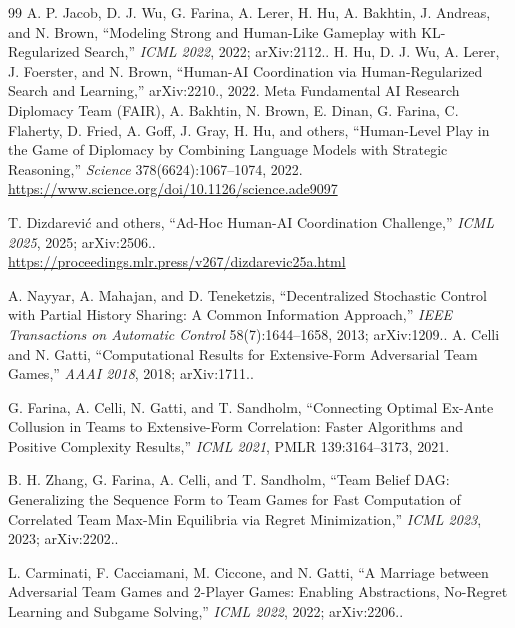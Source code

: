 \begin{thebibliography}{99}
A. P. Jacob, D. J. Wu, G. Farina, A. Lerer, H. Hu, A. Bakhtin, J. Andreas, and
N. Brown, ``Modeling Strong and Human-Like Gameplay with KL-Regularized
Search,'' \emph{ICML 2022}, 2022; arXiv:2112..
H. Hu, D. J. Wu, A. Lerer, J. Foerster, and N. Brown, ``Human-AI Coordination
via Human-Regularized Search and Learning,'' arXiv:2210., 2022.
Meta Fundamental AI Research Diplomacy Team (FAIR), A. Bakhtin, N. Brown,
E. Dinan, G. Farina, C. Flaherty, D. Fried, A. Goff, J. Gray, H. Hu, and others,
``Human-Level Play in the Game of Diplomacy by Combining Language Models with
Strategic Reasoning,'' \emph{Science} 378(6624):1067--1074, 2022.\\
\url{https://www.science.org/doi/10.1126/science.ade9097}

T. Dizdarevi\'c and others, ``Ad-Hoc Human-AI Coordination Challenge,''
\emph{ICML 2025}, 2025; arXiv:2506..\\
\url{https://proceedings.mlr.press/v267/dizdarevic25a.html}


A. Nayyar, A. Mahajan, and D. Teneketzis, ``Decentralized Stochastic Control
with Partial History Sharing: A Common Information Approach,'' \emph{IEEE
Transactions on Automatic Control} 58(7):1644--1658, 2013; arXiv:1209..
A. Celli and N. Gatti, ``Computational Results for Extensive-Form Adversarial
Team Games,'' \emph{AAAI 2018}, 2018; arXiv:1711..

G. Farina, A. Celli, N. Gatti, and T. Sandholm, ``Connecting Optimal Ex-Ante
Collusion in Teams to Extensive-Form Correlation: Faster Algorithms and Positive
Complexity Results,'' \emph{ICML 2021}, PMLR 139:3164--3173, 2021.

B. H. Zhang, G. Farina, A. Celli, and T. Sandholm, ``Team Belief DAG:
Generalizing the Sequence Form to Team Games for Fast Computation of Correlated
Team Max-Min Equilibria via Regret Minimization,'' \emph{ICML 2023}, 2023;
arXiv:2202..

L. Carminati, F. Cacciamani, M. Ciccone, and N. Gatti, ``A Marriage between
Adversarial Team Games and 2-Player Games: Enabling Abstractions, No-Regret
Learning and Subgame Solving,'' \emph{ICML 2022}, 2022; arXiv:2206..


\end{thebibliography}
